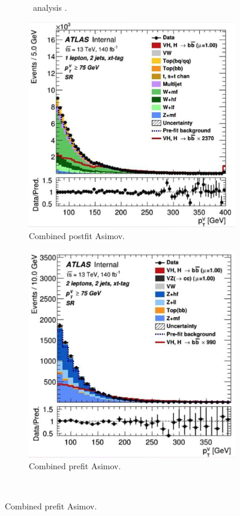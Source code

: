 \begin{figure}[h!]
\begin{subfigure}[b]{0.32\textwidth}
    \caption{\vhc\ analysis \cite{Collaboration:2721696}.}
    \label{fig:fit_old_vhcclimit}
\end{subfigure}
\begin{subfigure}[b]{0.32\textwidth}
    \centering
    \includegraphics[width=\textwidth]{Images/VH/Fit/fromSlides/Postfit/1L_xt_2j.png}
    \caption{Combined postfit Asimov.}
    \label{fig:fit_new_vhcclimitPostfit}
\end{subfigure}
\begin{subfigure}[b]{0.32\textwidth}
  \centering
  \includegraphics[width=\textwidth]{Images/VH/Fit/fromSlides/Postfit/2L_xt_2j.png}
  \caption{Combined prefit Asimov.}
  \label{fig:fit_new_vhcclimitPrefit}
\end{subfigure} \\


\end{figure}
